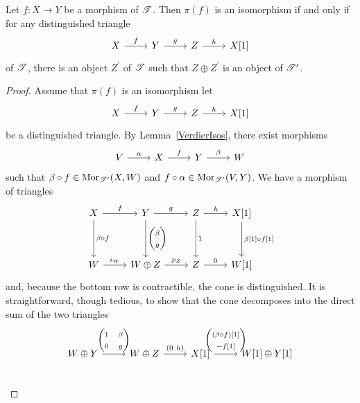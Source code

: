 \documentclass[dissertation.tex]{subfiles}
\begin{document}
\begin{prop}
  Let $f \colon X \rightarrow Y$ be a morphism of $\mathscr{T}$.
  Then $\pi(f)$ is an isomorphism if and only if for any distinguished triangle
  $$\begin{tikzcd}
    X \arrow{r}{f} & Y \arrow{r}{g} & Z \arrow{r}{h} & X[1]
  \end{tikzcd}$$
  of $\mathscr{T}$, there is an object $Z^\prime$ of $\mathscr{T}$ such that $Z \oplus Z^\prime$ is an object of $\mathscr{T}^\prime$.

  \begin{proof}
    Assume that $\pi(f)$ is an isomorphism let
    $$\begin{tikzcd}
      X \arrow{r}{f} & Y \arrow{r}{g} & Z \arrow{r}{h} & X[1]
    \end{tikzcd}$$
    be a distinguished triangle.
    By Lemma~\ref{VerdierIsos}, there exist morphisms
    $$\begin{tikzcd}
      V \arrow{r}{\alpha} & X \arrow{r}{f} & Y \arrow{r}{\beta} & W
    \end{tikzcd}$$
    such that $\beta \circ f \in \Mor{\T^\prime}(X,W)$ and $f \circ \alpha \in \Mor{\T^\prime}(V,Y)$.
    We have a morphism of triangles
    $$\begin{tikzcd}
      X \arrow{r}{f}\arrow{dd}{\beta \circ f} & Y \arrow{r}{g}\arrow{dd}{\left(\begin{matrix}\beta\\ g\end{matrix}\right)} & Z \arrow{r}{h}\arrow{dd}{1} & X[1]\arrow{dd}{\beta[1] \circ f[1]}\\
      \\
      W \arrow{r}{\imath_W} & W \oplus Z \arrow{r}{p_Z} & Z \arrow{r}{0} & W[1]
    \end{tikzcd}$$
    and, because the bottom row is contractible, the cone is distinguished.
    It is straightforward, though tedious, to show that the cone decomposes into the direct sum of the two triangles
    $$\begin{tikzcd}[ampersand replacement=\&]
      W \oplus Y \arrow{r}{\left(\begin{matrix}1 & \beta\\0 & g\end{matrix}\right)} \& W \oplus Z \arrow{r}{\left(0\ h\right)} \& X[1] \arrow{r}{\left(\begin{matrix}(\beta \circ f)[1]\\-f[1]\end{matrix}\right)} \& W[1] \oplus Y[1]\\

\end{tikzcd}$$
\end{proof}
\end{prop}
\end{document}
